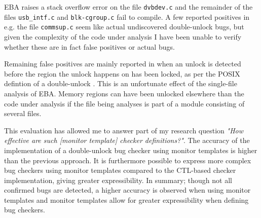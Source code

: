 \newpar EBA raises a stack overflow error on the file \texttt{dvbdev.c} and the remainder of the files \texttt{usb\_intf.c} and \texttt{blk-cgroup.c} fail to compile. A few reported positives in e.g. the file \texttt{commsup.c} seem like actual undiscovered double-unlock bugs, but given the complexity of the code under analysis I have been unable to verify whether these are in fact false positives or actual bugs. 

\newpar Remaining false positives are mainly reported in when an unlock is detected before the region the unlock happens on has been locked, as per the POSIX defintion of a double-unlock \cite{unlockPOSIX}. This is an unfortunate effect of the single-file analysis of EBA. Memory regions can have been unlocked elsewhere than the code under analysis if the file being analyses is part of a module consisting of several files. 

\newpar This evaluation has allowed me to answer part of my research question \textit{"How effective are such [monitor template] checker definitions?"}. The accuracy of the implementation of a double-unlock bug checker using monitor templates is higher than the previous approach. It is furthermore possible to express more complex bug checkers using monitor templates compared to the CTL-based checker implementation, giving greater expressibility. In summary; though not all confirmed bugs are detected, a higher accuracy is observed when using monitor templates and monitor templates allow for greater expressibility when defining bug checkers. 